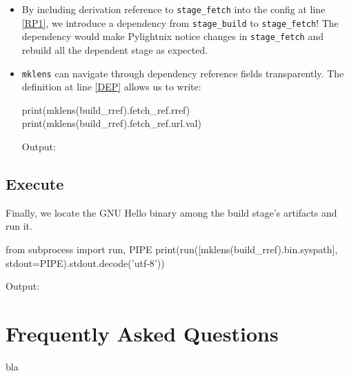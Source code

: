 \documentclass{article}
\begin{document}
\begin{itemize}
  \item By including derivation reference to \texttt{stage\_fetch} into
    the config at line \ref{RP1}, we introduce a dependency from
    \texttt{stage\_build} to \texttt{stage\_fetch}! The dependency would
    make Pylightnix notice changes in \texttt{stage\_fetch} and rebuild all
    the dependent stage as expected.

  \item \texttt{mklens} can navigate through dependency reference fields
    transparently. The definition at line \ref{DEP} allows us to write:

    \begin{pythontexcode}
      print(mklens(build_rref).fetch_ref.rref)
      print(mklens(build_rref).fetch_ref.url.val)
    \end{pythontexcode}

    Output:

    \mysmallstdout

\end{itemize}


\pagebreak
\subsection{Execute}

Finally, we locate the GNU Hello binary among the build stage's artifacts and
run it.

\begin{pythontexcode}
from subprocess import run, PIPE
print(run([mklens(build_rref).bin.syspath], stdout=PIPE).stdout.decode('utf-8'))
\end{pythontexcode}

Output:

\mystdout

\section{Frequently Asked Questions}

bla
\end{document}
